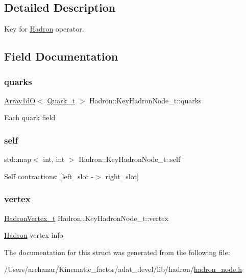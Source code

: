 \subsection{Detailed Description}
Key for \mbox{\hyperlink{namespaceHadron}{Hadron}} operator. 

\subsection{Field Documentation}
\mbox{\label{structHadron_1_1KeyHadronNode__t_a9bc87b9f4f298a6492714dfa94181055}} 
\subsubsection{\texorpdfstring{quarks}{quarks}}
{\footnotesize\ttfamily \mbox{\hyperlink{classADAT_1_1Array1dO}{Array1dO}}$<$ \mbox{\hyperlink{structHadron_1_1KeyHadronNode__t_1_1Quark__t}{Quark\+\_\+t}} $>$ Hadron\+::\+Key\+Hadron\+Node\+\_\+t\+::quarks}

Each quark field \mbox{\label{structHadron_1_1KeyHadronNode__t_a0993d215a770b56b86e8158325dd0538}} 
\subsubsection{\texorpdfstring{self}{self}}
{\footnotesize\ttfamily std\+::map$<$ int, int $>$ Hadron\+::\+Key\+Hadron\+Node\+\_\+t\+::self}

Self contractions\+: \mbox{[}left\+\_\+slot -\/$>$ right\+\_\+slot\mbox{]} \mbox{\label{structHadron_1_1KeyHadronNode__t_a3a89174f6f6abadc81a35f9555530098}} 
\subsubsection{\texorpdfstring{vertex}{vertex}}
{\footnotesize\ttfamily \mbox{\hyperlink{structHadron_1_1HadronVertex__t}{Hadron\+Vertex\+\_\+t}} Hadron\+::\+Key\+Hadron\+Node\+\_\+t\+::vertex}

\mbox{\hyperlink{namespaceHadron}{Hadron}} vertex info 

The documentation for this struct was generated from the following file\+:\begin{DoxyCompactItemize}
\item 
/\+Users/archanar/\+Kinematic\+\_\+factor/adat\+\_\+devel/lib/hadron/\mbox{\hyperlink{lib_2hadron_2hadron__node_8h}{hadron\+\_\+node.\+h}}\end{DoxyCompactItemize}
